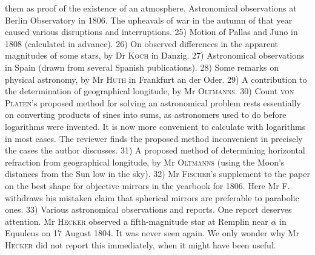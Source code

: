them as proof of the existence of an atmosphere. Astronomical observations at Berlin Observatory in 1806. The upheavals of war in the autumn of that year caused various disruptions and interruptions. 25) Motion of Pallas and Juno in 1808 (calculated in advance). 26) On observed differences in the apparent magnitudes of some stars, by Dr \textsc{Koch} in Danzig. 27) Astronomical observations in Spain (drawn from several Spanish publications). 28) Some remarks on physical astronomy, by Mr \textsc{Huth} in Frankfurt an der Oder. 29) A contribution to the determination of geographical longitude, by Mr \textsc{Oltmanns}. 30) Count \textsc{von Platen}’s proposed method for solving an astronomical problem rests essentially on converting products of sines into sums, as astronomers used to do before logarithms were invented. It is now more convenient to calculate with logarithms in most cases. The reviewer finds the proposed method inconvenient in precisely the cases the author discusses. 31) A proposed method of determining horizontal refraction from geographical longitude, by Mr \textsc{Oltmanns} (using the Moon’s distances from the Sun low in the sky). 32) Mr \textsc{Fischer}’s supplement to the paper on the best shape for objective mirrors in the yearbook for 1806. Here Mr F. withdraws his mistaken claim that spherical mirrors are preferable to parabolic ones. 33) Various astronomical observations and reports. One report deserves attention. Mr \textsc{Hecker} observed a fifth-magnitude star at Remplin near $\alpha$ in Equuleus on 17 August 1804. It was never seen again. We only wonder why Mr \textsc{Hecker} did not report this immediately, when it might have been useful.
